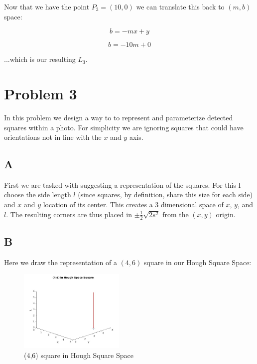 \documentclass{article}
\begin{document}
\noindent Now that we have the point $P_3=(10,0)$ we can translate this back to $(m,b)$ space:

\begin{equation}
    b = -mx + y
\end{equation}

\begin{equation}
    b = -10m + 0
\end{equation}

\noindent ...which is our resulting $L_3$.

\section*{Problem 3}

In this problem we design a way to to represent and parameterize detected squares within a photo. For simplicity we are ignoring squares that could have orientations not in line with the $x$ and $y$ axis.

\subsection*{A}

First we are tasked with suggesting a representation of the squares. For this I choose the side length $l$ (since squares, by definition, share this size for each side) and $x$ and $y$ location of its center. This creates a 3 dimensional space of $x$, $y$, and $l$. The resulting corners are thus placed in $\pm \frac{1}{2} \sqrt{2s^2}$ from the $(x,y)$ origin.

\subsection*{B}

Here we draw the representation of a $(4,6)$ square in our Hough Square Space:

\begin{figure}[H]
    \centering
    \includegraphics[width = 0.45\textwidth]{imgs/prob3_b.jpg}
    \caption{(4,6) square in Hough Square Space}
    \label{fig:prob3_b}
\end{figure}
\end{document}
